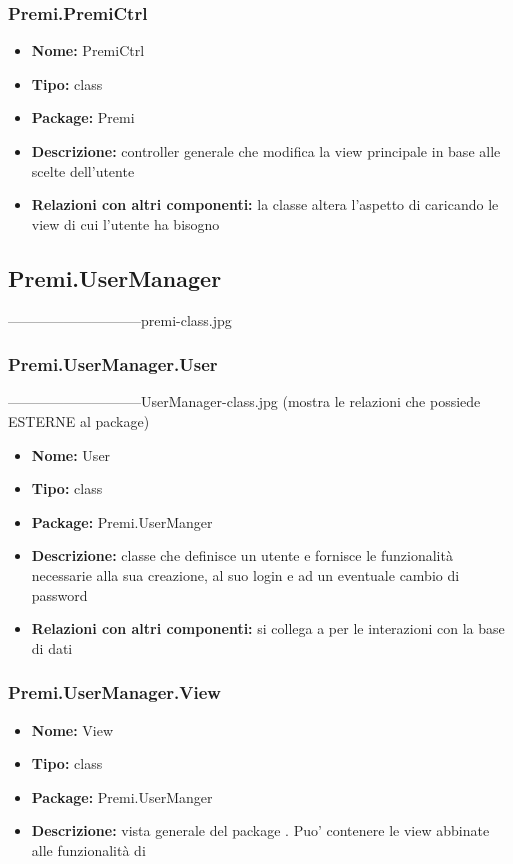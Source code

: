 \subsubsection{Premi.PremiCtrl}
\begin{itemize}
  \item \textbf{Nome:} PremiCtrl
  \item \textbf{Tipo:} class
  \item \textbf{Package:} Premi
  \item \textbf{Descrizione:} controller generale che modifica la view principale in base alle scelte dell'utente
  \item \textbf{Relazioni con altri componenti:} la classe altera l'aspetto di  caricando le view di cui l'utente ha bisogno 
\end{itemize}

\subsection{Premi.UserManager}
-----------------------------premi-class.jpg
\subsubsection{Premi.UserManager.User}
-----------------------------UserManager-class.jpg (mostra le relazioni che possiede ESTERNE al package)
\begin{itemize}
  \item \textbf{Nome:} User
  \item \textbf{Tipo:} class
  \item \textbf{Package:} Premi.UserManger
  \item \textbf{Descrizione:} classe che definisce un utente e fornisce le funzionalità necessarie alla sua creazione, al suo login e ad un eventuale cambio di password
  \item \textbf{Relazioni con altri componenti:} si collega a  per le interazioni con la base di dati
\end{itemize}

\subsubsection{Premi.UserManager.View}
\begin{itemize}
  \item \textbf{Nome:} View
  \item \textbf{Tipo:} class
  \item \textbf{Package:} Premi.UserManger
  \item \textbf{Descrizione:} vista generale del package . Puo' contenere le view abbinate alle funzionalità di 
\end{itemize}
